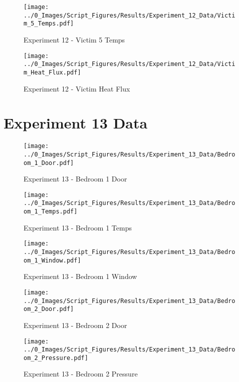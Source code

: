 	\begin{figure}[H]
		\centering
		\texttt{[image: ../0\_Images/Script\_Figures/Results/Experiment\_12\_Data/Victim\_5\_Temps.pdf]}
		\caption[]{Experiment 12 - Victim 5 Temps}
	\end{figure}
 
	\clearpage

	\begin{figure}[H]
		\centering
		\texttt{[image: ../0\_Images/Script\_Figures/Results/Experiment\_12\_Data/Victim\_Heat\_Flux.pdf]}
		\caption[]{Experiment 12 - Victim Heat Flux}
	\end{figure}
 

\clearpage		\large
\section{Experiment 13 Data} \label{App:Exp13Results} 

	\begin{figure}[H]
		\centering
		\texttt{[image: ../0\_Images/Script\_Figures/Results/Experiment\_13\_Data/Bedroom\_1\_Door.pdf]}
		\caption[]{Experiment 13 - Bedroom 1 Door}
	\end{figure}
 

	\begin{figure}[H]
		\centering
		\texttt{[image: ../0\_Images/Script\_Figures/Results/Experiment\_13\_Data/Bedroom\_1\_Temps.pdf]}
		\caption[]{Experiment 13 - Bedroom 1 Temps}
	\end{figure}
 
	\clearpage

	\begin{figure}[H]
		\centering
		\texttt{[image: ../0\_Images/Script\_Figures/Results/Experiment\_13\_Data/Bedroom\_1\_Window.pdf]}
		\caption[]{Experiment 13 - Bedroom 1 Window}
	\end{figure}
 

	\begin{figure}[H]
		\centering
		\texttt{[image: ../0\_Images/Script\_Figures/Results/Experiment\_13\_Data/Bedroom\_2\_Door.pdf]}
		\caption[]{Experiment 13 - Bedroom 2 Door}
	\end{figure}
 
	\clearpage

	\begin{figure}[H]
		\centering
		\texttt{[image: ../0\_Images/Script\_Figures/Results/Experiment\_13\_Data/Bedroom\_2\_Pressure.pdf]}
		\caption[]{Experiment 13 - Bedroom 2 Pressure}
	\end{figure}
 

